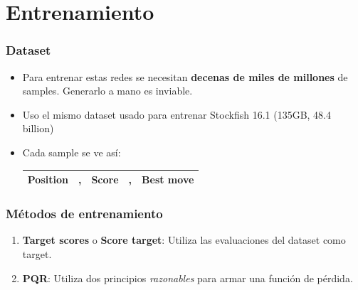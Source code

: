 
\section{Entrenamiento}

\begin{frame}
\frametitle{Dataset}
\begin{itemize}
\item<1-> Para entrenar estas redes se necesitan \textbf{decenas de miles de millones} de samples. Generarlo a mano es inviable.
\item<2-> Uso el mismo dataset usado para entrenar Stockfish 16.1 (135GB, 48.4 billion)
\item<3-> Cada sample se ve así:
\begin{center}
\begin{tabular}{|cp{0.0005cm}cp{0.0005cm}c|}
\hline
\textbf{Position} & , & \textbf{Score} & , & \textbf{Best move} \\
\hline
\end{tabular}
\end{center}
\end{itemize}
\end{frame}

\begin{frame}
\frametitle{Métodos de entrenamiento}
\begin{enumerate}
\item \textbf{Target scores} o \textbf{Score target}: Utiliza las evaluaciones del dataset como target.
\item \textbf{PQR}: Utiliza dos principios \textit{razonables} para armar una función de pérdida.
\end{enumerate}
\end{frame}

